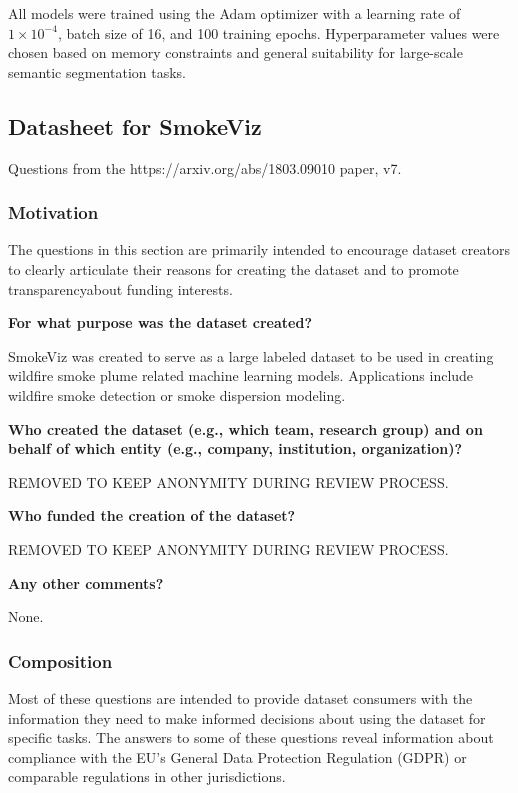 \documentclass{article}
\begin{document}
All models were trained using the Adam optimizer with a learning rate of \(1 \times 10^{-4}\), batch size of 16, and 100 training epochs. Hyperparameter values were chosen based on memory constraints and general suitability for large-scale semantic segmentation tasks. 

\pagebreak

\subsection{Datasheet for SmokeViz}

Questions from the https://arxiv.org/abs/1803.09010 paper, v7.

\subsubsection{Motivation}

The questions in this section are primarily intended to encourage dataset creators to clearly articulate their reasons for creating the dataset and to promote transparencyabout funding interests.

\textbf{For what purpose was the dataset created? }

SmokeViz was created to serve as a large labeled dataset to be used in creating wildfire smoke plume related machine learning models. Applications include wildfire smoke detection or smoke dispersion modeling.

\textbf{Who created the dataset (e.g., which team, research group) and on behalf of which entity (e.g., company, institution, organization)?}

REMOVED TO KEEP ANONYMITY DURING REVIEW PROCESS.

\textbf{Who funded the creation of the dataset?} 

REMOVED TO KEEP ANONYMITY DURING REVIEW PROCESS.

\textbf{Any other comments?}

None.

\subsubsection{Composition}

Most of these questions are intended to provide dataset consumers with the information they need to make informed decisions about using the dataset for specific tasks. The answers to some of these questions reveal information about compliance with the EU’s General Data Protection Regulation (GDPR) or comparable regulations in other jurisdictions.
\end{document}
